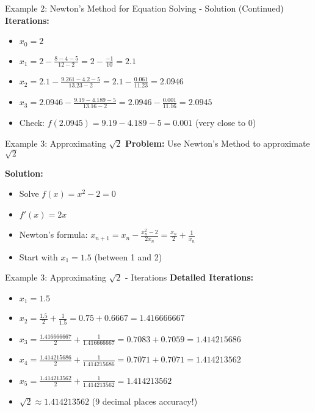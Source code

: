 \documentclass[aspectratio=169]{beamer}
\begin{document}
\begin{frame}{Example 2: Newton's Method for Equation Solving - Solution (Continued)}
\textbf{Iterations:}
\begin{itemize}
    \item $x_0 = 2$
    \item $x_1 = 2 - \frac{8 - 4 - 5}{12 - 2} = 2 - \frac{-1}{10} = 2.1$
    \item $x_2 = 2.1 - \frac{9.261 - 4.2 - 5}{13.23 - 2} = 2.1 - \frac{0.061}{11.23} = 2.0946$
    \item $x_3 = 2.0946 - \frac{9.19 - 4.189 - 5}{13.16 - 2} = 2.0946 - \frac{0.001}{11.16} = 2.0945$
    \item Check: $f(2.0945) = 9.19 - 4.189 - 5 = 0.001$ (very close to 0)
\end{itemize}
\end{frame}

\begin{frame}{Example 3: Approximating $\sqrt{2}$}
\textbf{Problem:} Use Newton's Method to approximate $\sqrt{2}$

\textbf{Solution:}
\begin{itemize}
    \item Solve $f(x) = x^2 - 2 = 0$
    \item $f'(x) = 2x$
    \item Newton's formula: $x_{n+1} = x_n - \frac{x_n^2 - 2}{2x_n} = \frac{x_n}{2} + \frac{1}{x_n}$
    \item Start with $x_1 = 1.5$ (between 1 and 2)
\end{itemize}
\end{frame}

\begin{frame}{Example 3: Approximating $\sqrt{2}$ - Iterations}
\textbf{Detailed Iterations:}
\begin{itemize}
    \item $x_1 = 1.5$
    \item $x_2 = \frac{1.5}{2} + \frac{1}{1.5} = 0.75 + 0.6667 = 1.416666667$
    \item $x_3 = \frac{1.416666667}{2} + \frac{1}{1.416666667} = 0.7083 + 0.7059 = 1.414215686$
    \item $x_4 = \frac{1.414215686}{2} + \frac{1}{1.414215686} = 0.7071 + 0.7071 = 1.414213562$
    \item $x_5 = \frac{1.414213562}{2} + \frac{1}{1.414213562} = 1.414213562$
    \item $\sqrt{2} \approx 1.414213562$ (9 decimal places accuracy!)
\end{itemize}
\end{frame}
\end{document}
